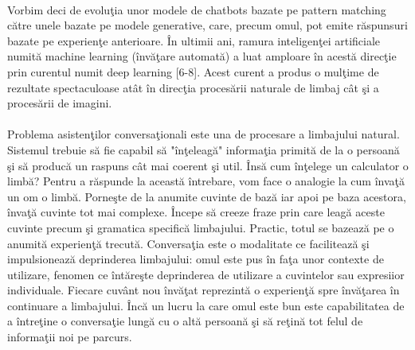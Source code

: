 \paragraph{}
Vorbim deci de evolu\c tia unor modele de chatbots bazate pe pattern matching c\u atre unele bazate pe modele generative, care, precum omul, pot emite r\u aspunsuri bazate pe experien\c te anterioare. \^ In ultimii ani, ramura inteligen\c tei artificiale numit\u a machine learning  (\^ inv\u a\c tare automat\u a) a luat amploare \^ in acest\u a direc\c tie prin curentul numit deep learning [6-8]. Acest curent a produs o mul\c time de rezultate spectaculoase at\^ at \^ in direc\c tia proces\u arii naturale de limbaj c\^ at \c si a proces\u arii de imagini. 

\paragraph{}
Problema asisten\c tilor conversa\c tionali este una de procesare a limbajului natural. Sistemul trebuie s\u a fie capabil s\u a "\^ in\c teleag\u a" informa\c tia primit\u a de la o persoan\u a \c si s\u a produc\u a un raspuns c\^ at mai coerent \c si util. \^ Ins\u a cum \^ in\c telege un calculator o limb\u a? Pentru a r\u aspunde la aceast\u a \^ intrebare, vom face o analogie la cum \^ inva\c t\u a un om o limb\u a. Porne\c ste de la anumite cuvinte de baz\u a iar apoi pe baza acestora, \^ inva\c t\u a cuvinte tot mai complexe. \^ Incepe s\u a creeze fraze prin care leag\u a aceste cuvinte precum \c si gramatica specific\u a limbajului. Practic, totul se bazeaz\u a pe o anumit\u a experien\c t\u a trecut\u a. Conversa\c tia este o modalitate ce faciliteaz\u a \c si impulsioneaz\u a deprinderea limbajului: omul este pus \^ in fa\c ta unor contexte de utilizare, fenomen ce \^ int\u are\c ste deprinderea de utilizare a cuvintelor sau expresiior individuale. Fiecare cuv\^ ant nou \^ inv\u a\c tat reprezint\u a o experien\c t\u a spre \^ inv\u a\c tarea \^ in continuare a limbajului. \^ Inc\u a un lucru la care omul este bun este capabilitatea de a \^ intre\c tine o conversa\c tie lung\u a cu o alt\u a persoan\u a \c si s\u a re\c tin\u a tot felul de informa\c tii noi pe parcurs.

